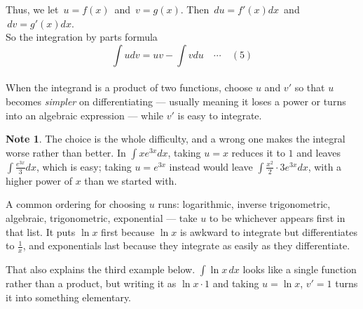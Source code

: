 \documentclass[11pt,a4paper]{article}
\theoremstyle{definition}
\newtheorem{note}[thm]{Note}
\begin{document}
Thus, we let $\, u = f(x)\,$ and $\, v = g(x)$. Then $\, du = f'(x)dx\,$ and $\, dv = g'(x)dx$.\\

So the integration by parts formula 
$$\int u dv = uv - \int vdu  \quad \cdots\quad  (5) $$\\



When the integrand is a product of two functions, choose $u$ and $v'$ so that $u$
becomes \emph{simpler} on differentiating --- usually meaning it loses a power or
turns into an algebraic expression --- while $v'$ is easy to integrate.

\begin{note}
The choice is the whole difficulty, and a wrong one makes the integral worse rather
than better. In $\int xe^{3x}dx$, taking $u=x$ reduces it to $1$ and leaves
$\int \frac{e^{3x}}{3}dx$, which is easy; taking $u=e^{3x}$ instead would leave
$\int \frac{x^{2}}{2}\cdot 3e^{3x}dx$, with a higher power of $x$ than we started
with.

A common ordering for choosing $u$ runs: logarithmic, inverse trigonometric,
algebraic, trigonometric, exponential --- take $u$ to be whichever appears first in
that list. It puts $\ln x$ first because $\ln x$ is awkward to integrate but
differentiates to $\frac{1}{x}$, and exponentials last because they integrate as
easily as they differentiate.

That also explains the third example below. $\int\ln x\,dx$ looks like a single
function rather than a product, but writing it as $\ln x\cdot 1$ and taking
$u=\ln x$, $v'=1$ turns it into something elementary.
\end{note}
\end{document}
